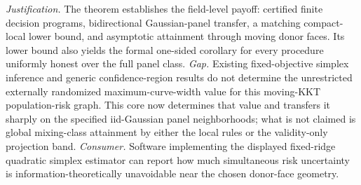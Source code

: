 \documentclass{article}
\begin{document}
\par\smallskip\noindent \textit{Justification.} The theorem establishes the field-level payoff: certified finite decision programs, bidirectional Gaussian-panel transfer, a matching compact-local lower bound, and asymptotic attainment through moving donor faces. Its lower bound also yields the formal one-sided corollary for every procedure uniformly honest over the full panel class. \textit{Gap.} Existing fixed-objective simplex inference and generic confidence-region results do not determine the unrestricted externally randomized maximum-curve-width value for this moving-KKT population-risk graph. This core now determines that value and transfers it sharply on the specified iid-Gaussian panel neighborhoods; what is not claimed is global mixing-class attainment by either the local rules or the validity-only projection band. \textit{Consumer.} Software implementing the displayed fixed-ridge quadratic simplex estimator can report how much simultaneous risk uncertainty is information-theoretically unavoidable near the chosen donor-face geometry.
\end{document}
